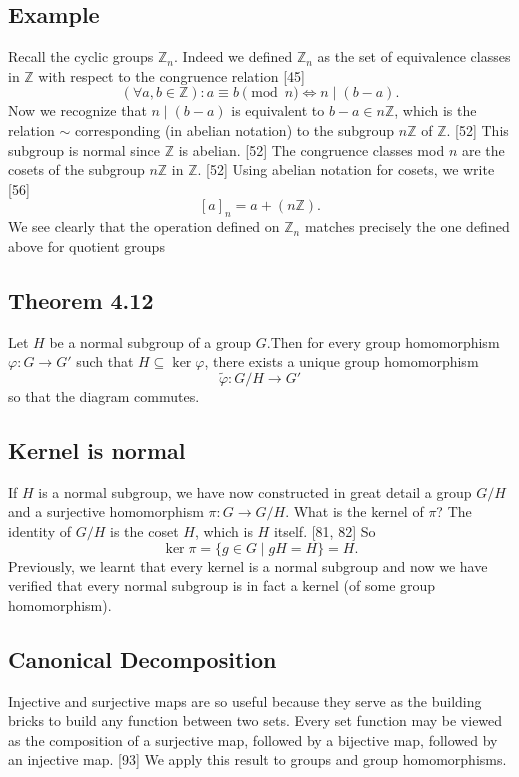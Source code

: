 \subsection*{Example}
Recall the cyclic groups $\mathbb{Z}_n$. Indeed we defined $\mathbb{Z}_n$ as the set of equivalence classes in $\mathbb{Z}$ with respect to the congruence relation [45]
$$(\forall a,b \in \mathbb{Z}): a \equiv b \pmod n \iff n \mid (b-a).$$
Now we recognize that $n \mid (b-a)$ is equivalent to $b-a \in n\mathbb{Z}$,  which is the relation $\sim$ corresponding (in abelian notation) to the subgroup $n\mathbb{Z}$ of $\mathbb{Z}$. [52] This subgroup is normal since $\mathbb{Z}$ is abelian. [52] The congruence classes mod $n$ are the cosets of the subgroup $n\mathbb{Z}$ in $\mathbb{Z}$. [52] Using abelian notation for cosets, we write [56]
$$[a]_n = a + (n\mathbb{Z}).$$
We see clearly that the operation defined on $\mathbb{Z}_n$ matches precisely the one defined above for quotient groups

\subsection*{Theorem 4.12}
Let $H$ be a normal subgroup of a group $G$.Then for every group homomorphism $\varphi: G \to G'$ such that $H \subseteq \ker \varphi$, there exists a unique group homomorphism
$$\tilde{\varphi}: G/H \to G'$$
so that the diagram commutes.

\subsection*{Kernel is normal}
If $H$ is a normal subgroup, we have now constructed in great detail a group $G/H$ and a surjective homomorphism $\pi: G \to G/H$. What is the kernel of $\pi$? The identity of $G/H$ is the coset $H$, which is $H$ itself. [81, 82] So
$$\ker \pi = \{g \in G \mid gH = H\} = H. $$
Previously, we learnt that every kernel is a normal subgroup and now we have verified that every normal subgroup is in fact a kernel (of some group homomorphism).

\subsection*{Canonical Decomposition}
Injective and surjective maps are so useful because they serve as the building bricks to build any function between two sets. Every set function may be viewed as the composition of a surjective map, followed by a bijective map, followed by an injective map. [93] We apply this result to groups and group homomorphisms.

